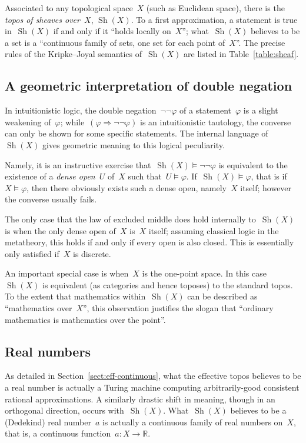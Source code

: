\documentclass[oneside,reqno]{amsart}
\theoremstyle{definition}
\theoremstyle{plain}
\theoremstyle{remark}
\newcommand{\RR}{\mathbb{R}}
\DeclareMathOperator{\Sh}{Sh}
\renewcommand{\_}{\mathpunct{.}\,}
\newcommand{\effective}{ef{}fective\xspace}
\newcommand{\?}{\,{:}\,}
\begin{document}

Associated to any topological space~$X$ (such as Euclidean space), there is the
\emph{topos of sheaves over~$X$}, $\Sh(X)$. To a first approximation, a
statement is true in~$\Sh(X)$ if and only if it ``holds locally on~$X$'';
what~$\Sh(X)$ believes to be a set is a ``continuous family of sets, one set
for each point of~$X$''. The precise rules of the Kripke--Joyal semantics
of~$\Sh(X)$ are listed in Table~\ref{table:sheaf}.


\subsection{A geometric interpretation of double negation}
In intuitionistic logic, the double negation~$\neg\neg\varphi$ of a
statement~$\varphi$ is a slight weakening of~$\varphi$; while~$(\varphi
\Rightarrow \neg\neg\varphi)$ is an intuitionistic tautology, the converse can
only be shown for some specific statements. The internal language of~$\Sh(X)$
gives geometric meaning to this logical peculiarity.

Namely, it is an instructive exercise that~$\Sh(X) \models \neg\neg\varphi$ is equivalent to the
existence of a \emph{dense open}~$U$ of~$X$ such that~$U \models \varphi$.
If~$\Sh(X) \models \varphi$, that is if~$X \models \varphi$, then there
obviously exists such a dense open, namely~$X$ itself; however the converse
usually fails.

The only case that the law of excluded middle does hold internally to~$\Sh(X)$
is when the only dense open of~$X$ is~$X$ itself; assuming classical logic in
the metatheory, this holds if and only if every open is also closed. This is
essentially only satisfied if~$X$ is discrete.

An important special case is when~$X$ is the one-point space. In this
case~$\Sh(X)$ is equivalent (as categories and hence toposes) to the standard
topos. To the extent that mathematics within~$\Sh(X)$ can be described as ``mathematics
over~$X$'', this observation justifies the slogan that ``ordinary mathematics
is mathematics over the point''.


\subsection{Real numbers}
As detailed in Section~\ref{sect:eff-continuous}, what the \effective topos believes to be a real number is
actually a Turing machine computing arbitrarily-good consistent rational
approximations. A similarly drastic shift in meaning, though in an orthogonal
direction, occurs with~$\Sh(X)$. What~$\Sh(X)$ believes to be a (Dedekind) real
number~$a$ is actually a continuous family of real numbers on~$X$, that is, a
continuous function~$a : X \to \RR$.
\end{document}
